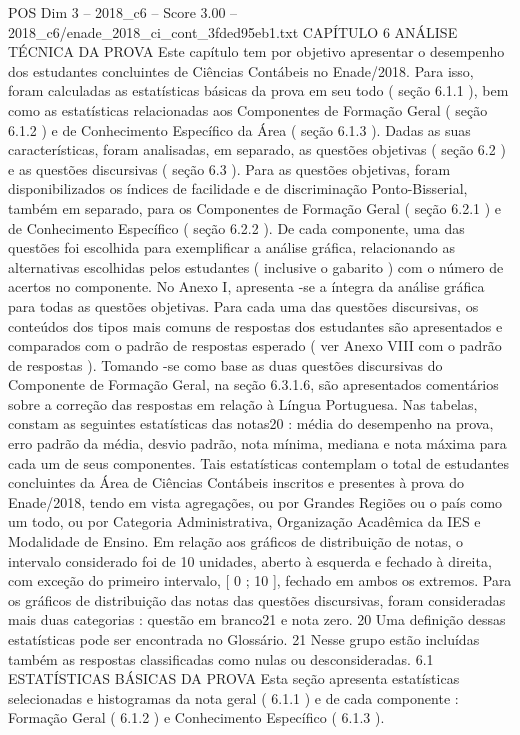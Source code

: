 \begin{textsample}{POS Dim 3 – 2018\_c6 – Score 3.00 – 2018\_c6/enade\_2018\_ci\_cont\_3fded95eb1.txt}  \label{ex:f3_pos_111}
CAPÍTULO 6 ANÁLISE TÉCNICA DA PROVA Este capítulo tem por objetivo apresentar o desempenho dos estudantes concluintes de Ciências Contábeis no Enade/2018.
Para isso, foram calculadas as estatísticas básicas da prova em seu todo ( seção 6.1.1 ), bem como as estatísticas relacionadas aos Componentes de Formação Geral ( seção 6.1.2 ) e de Conhecimento Específico da Área ( seção 6.1.3 ).
Dadas as suas características, foram analisadas, em separado, as questões objetivas ( seção 6.2 ) e as questões discursivas ( seção 6.3 ).
Para as questões objetivas, foram disponibilizados os índices de facilidade e de discriminação Ponto-Bisserial, também em separado, para os Componentes de Formação Geral ( seção 6.2.1 ) e de Conhecimento Específico ( seção 6.2.2 ).
De cada componente, uma das questões foi escolhida para exemplificar a análise gráfica, relacionando as alternativas escolhidas pelos estudantes ( inclusive o gabarito ) com o número de acertos no componente.
No Anexo I, apresenta -se a íntegra da análise gráfica para todas as questões objetivas.
Para cada uma das questões discursivas, os conteúdos dos tipos mais comuns de respostas dos estudantes são apresentados e comparados com o padrão de respostas esperado ( ver Anexo VIII com o padrão de respostas ).
Tomando -se como base as duas questões discursivas do Componente de Formação Geral, na seção 6.3.1.6, são apresentados comentários sobre a correção das respostas em relação à Língua Portuguesa.
Nas tabelas, constam as seguintes estatísticas das notas20 : média do desempenho na prova, erro padrão da média, desvio padrão, nota mínima, mediana e nota máxima para cada um de seus componentes.
Tais estatísticas contemplam o total de estudantes concluintes da Área de Ciências Contábeis inscritos e presentes à prova do Enade/2018, tendo em vista agregações, ou por Grandes Regiões ou o país como um todo, ou por Categoria Administrativa, Organização Acadêmica da IES e Modalidade de Ensino.
Em relação aos gráficos de distribuição de notas, o intervalo considerado foi de 10 unidades, aberto à esquerda e fechado à direita, com exceção do primeiro intervalo, [ 0 ; 10 ], fechado em ambos os extremos.
Para os gráficos de distribuição das notas das questões discursivas, foram consideradas mais duas categorias : questão em branco21 e nota zero. 20 Uma definição dessas estatísticas pode ser encontrada no Glossário. 21 Nesse grupo estão incluídas também as respostas classificadas como nulas ou desconsideradas. 6.1 ESTATÍSTICAS BÁSICAS DA PROVA Esta seção apresenta estatísticas selecionadas e histogramas da nota geral ( 6.1.1 ) e de cada componente : Formação Geral ( 6.1.2 ) e Conhecimento Específico ( 6.1.3 ).

\end{textsample}
